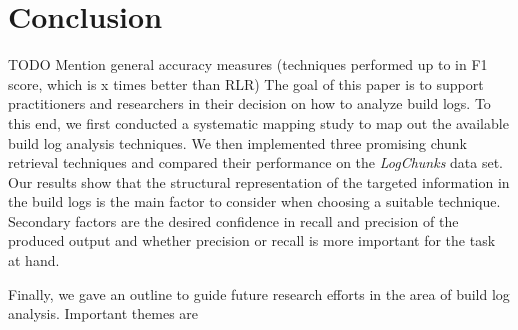 \section{Conclusion}
\label{sec:conclusion-fw}
 TODO Mention general accuracy measures (techniques performed
up to in F1 score, which is x times better than RLR)
The goal of this paper is to support practitioners and researchers in
their decision on how to analyze build logs.
To this end, we first
conducted a systematic mapping study to map out the available build
log analysis techniques.
We then
implemented three promising chunk retrieval techniques and compared
their performance on the \emph{LogChunks} data set.
Our results show
that the structural representation of the targeted information in the
build logs is the main factor to consider when choosing a suitable
technique.
Secondary factors are the desired confidence in recall and
precision of the produced output and whether precision or recall is
more important for the task at hand.

Finally, we gave an
outline to guide future research efforts in the area of build log
analysis.
Important themes are


